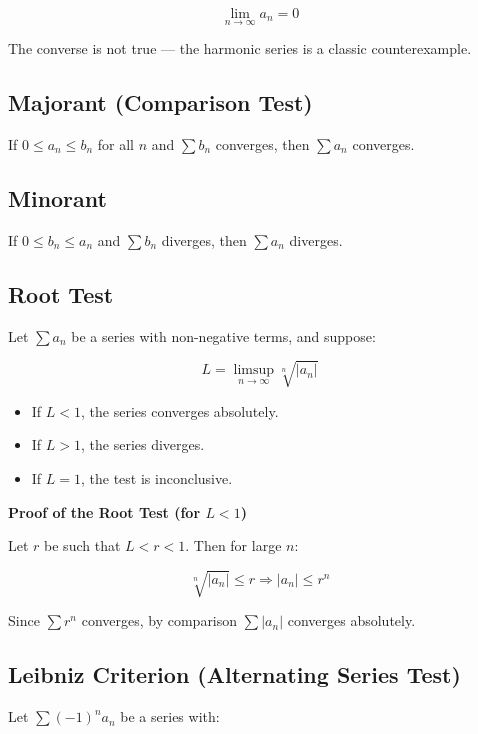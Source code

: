 \[
    \lim_{n \to \infty} a_n = 0
\]

The converse is not true — the harmonic series is a classic counterexample.

\subsection{Majorant (Comparison Test)} 

If \(0 \le a_n \le b_n\) for all \(n\) and \(\sum b_n\) converges, then \(\sum a_n\) converges.

\subsection{Minorant} 

If \(0 \le b_n \le a_n\) and \(\sum b_n\) diverges, then \(\sum a_n\) diverges.

\subsection{Root Test}

Let \(\sum a_n\) be a series with non-negative terms, and suppose:

\[
    L = \limsup_{n \to \infty} \sqrt[n]{|a_n|}
\]

\begin{itemize}

  \item If \(L < 1\), the series converges absolutely.

  \item If \(L > 1\), the series diverges.

  \item If \(L = 1\), the test is inconclusive.

\end{itemize}

\textbf{Proof of the Root Test (for \(L < 1\))}

Let \(r\) be such that \(L < r < 1\). Then for large \(n\):

\[
    \sqrt[n]{|a_n|} \le r \Rightarrow |a_n| \le r^n
\]

Since \(\sum r^n\) converges, by comparison \(\sum |a_n|\) converges absolutely.

\subsection{Leibniz Criterion (Alternating Series Test)}

Let \(\sum {(-1)}^n a_n\) be a series with:

